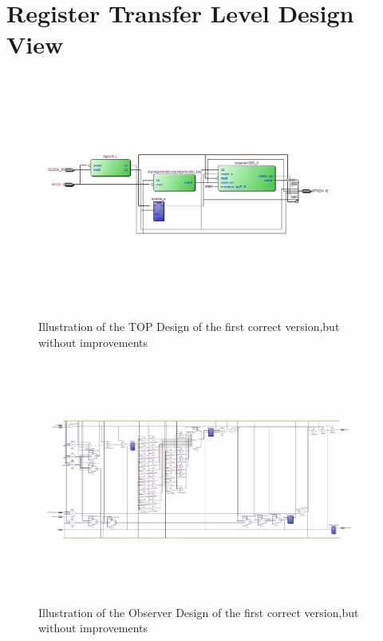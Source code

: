 
\chapter{Register Transfer Level Design View}
\label{appendix:2}

\begin{figure}[h]
\centering
\includegraphics[width=650px,height=300px,angle=-90]{../../pictures/20.02.2014/TOP.jpg}
\caption[TOP Design of the First Version]{Illustration of the TOP Design of the first correct version,but without improvements}
\label{fig:version:one:top}
\end{figure}

\begin{figure}[h]
\centering
\includegraphics[width=650px,height=300px,angle=-90]{../../pictures/20.02.2014/observer_OBS_0.jpg}
\caption[Observer Design of the First Version]{Illustration of the Observer Design of the first correct version,but without improvements}
\label{fig:version:one:obs}
\end{figure}

